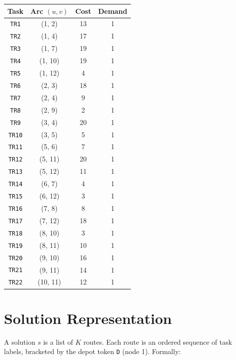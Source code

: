 \documentclass[12pt, a4paper]{article}
\begin{document}
\begin{center}
\renewcommand{\arraystretch}{1.2}
\begin{tabular}{cccc}
\toprule
\textbf{Task} & \textbf{Arc} $(u, v)$ & \textbf{Cost} & \textbf{Demand} \\
\midrule
\texttt{TR1}  & (1, 2)   & 13 & 1 \\
\texttt{TR2}  & (1, 4)   & 17 & 1 \\
\texttt{TR3}  & (1, 7)   & 19 & 1 \\
\texttt{TR4}  & (1, 10)  & 19 & 1 \\
\texttt{TR5}  & (1, 12)  &  4 & 1 \\
\texttt{TR6}  & (2, 3)   & 18 & 1 \\
\texttt{TR7}  & (2, 4)   &  9 & 1 \\
\texttt{TR8}  & (2, 9)   &  2 & 1 \\
\texttt{TR9}  & (3, 4)   & 20 & 1 \\
\texttt{TR10} & (3, 5)   &  5 & 1 \\
\texttt{TR11} & (5, 6)   &  7 & 1 \\
\texttt{TR12} & (5, 11)  & 20 & 1 \\
\texttt{TR13} & (5, 12)  & 11 & 1 \\
\texttt{TR14} & (6, 7)   &  4 & 1 \\
\texttt{TR15} & (6, 12)  &  3 & 1 \\
\texttt{TR16} & (7, 8)   &  8 & 1 \\
\texttt{TR17} & (7, 12)  & 18 & 1 \\
\texttt{TR18} & (8, 10)  &  3 & 1 \\
\texttt{TR19} & (8, 11)  & 10 & 1 \\
\texttt{TR20} & (9, 10)  & 16 & 1 \\
\texttt{TR21} & (9, 11)  & 14 & 1 \\
\texttt{TR22} & (10, 11) & 12 & 1 \\
\bottomrule
\end{tabular}
\end{center}

\section{Solution Representation}

A solution $s$ is a list of $K$ routes. Each route is an ordered
sequence of task labels, bracketed by the depot token \texttt{D}
(node 1). Formally:
\end{document}
